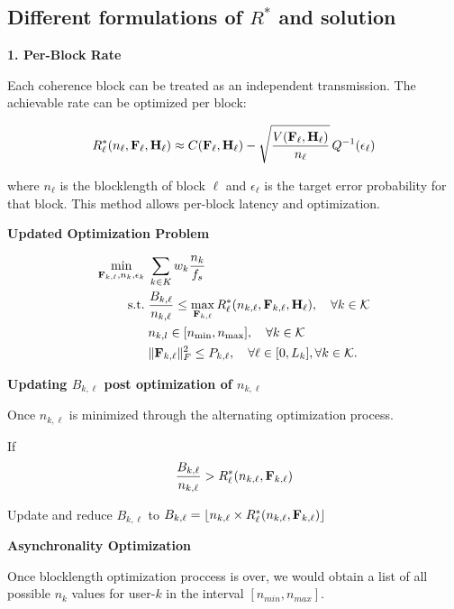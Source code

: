 \documentclass[a4paper, 12pt, onecolumn, journal, twoside, draftclsnofoot]{IEEEtran}
\begin{document}
\subsection{Different formulations of $R^*$ and solution}

\textbf{1. Per-Block Rate}

Each coherence block can be treated as an independent transmission. The achievable rate can be optimized per block:

\begin{equation*}
	R^*_\ell(n_\ell, {\bf F}_\ell, {\bf H}_\ell) \approx C({\bf F}_\ell, {\bf H}_\ell) - \sqrt{\frac{V({\bf F}_\ell, {\bf H}_\ell)}{n_\ell}} \, Q^{-1}(\epsilon_\ell)
\end{equation*}

where $n_\ell$ is the blocklength of block $\ell$ and $\epsilon_\ell$ is the target error probability for that block. This method allows per-block latency and optimization.

\textbf{Updated Optimization Problem} 

\begin{equation*}
	\begin{split}
		\min_{{\bf F}_{k,\ell}, n_{k}, \epsilon_k} \;& \sum_{k \in K} w_k \frac{n_k}{f_s} \\
		\text{s.t.}\;& \frac{B_{k,\ell}}{n_{k,\ell}} \leq \max_{{\bf F}_{k, \ell}} R^*_\ell(n_{k,\ell}, {\bf F}_{k, \ell},  {\bf H}_\ell), \quad \forall k \in { \mathcal{K} } \\ 
		& n_{k,l} \in [n_{\text{min}}, n_{\text{max}}], \quad \forall k \in { \mathcal{K} } \\
		& \|{\bf F}_{k,\ell}\|_F^2 \leq P_{k,\ell}, \quad \forall \ell \in [0, L_k],  \forall k \in { \mathcal{K} }.
	\end{split}
\end{equation*}


\textbf{Updating $B_{k, \ell}$ post optimization of $n_{k,\ell}$}

Once $n_{k, \ell}$ is minimized through the alternating optimization process.

If 
\begin{equation*}
	\frac{B_{k,\ell}}{n_{k,\ell}} > R^*_\ell(n_{k,\ell}, {\bf F}_{k, \ell})
\end{equation*}

Update and reduce $B_{k, \ell}$ to $B_{k, \ell} =  \lfloor n_{k, \ell} \times R^*_\ell(n_{k,\ell}, {\bf F}_{k, \ell}) \rfloor$

\textbf{Asynchronality Optimization}

Once blocklength optimization proccess is over, we would obtain a list of all possible $n_k$ values for user-$k$ in the interval $[n_{min}, n_{max}]$.
\end{document}
